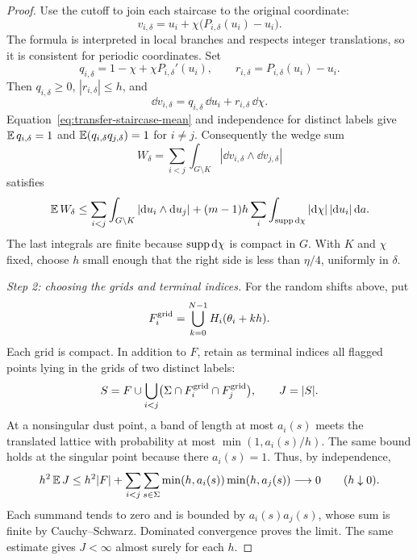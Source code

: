 \begin{proof}
Use the cutoff to join each staircase to the original coordinate:
\begin{equation}\label{eq:transfer-staircase}
 v_{i,\delta}
 =u_i+\chi\bigl(P_{i,\delta}(u_i)-u_i\bigr).
\end{equation}
The formula is interpreted in local branches and respects integer
translations, so it is consistent for periodic coordinates.  Set
\[
 q_{i,\delta}=1-\chi+\chi P_{i,\delta}'(u_i),
 \qquad r_{i,\delta}=P_{i,\delta}(u_i)-u_i.
\]
Then $q_{i,\delta}\ge0$, $|r_{i,\delta}|\le h$, and
\[
 \dd v_{i,\delta}
 =q_{i,\delta}\,\dd u_i+r_{i,\delta}\,\dd\chi.
\]
Equation~\eqref{eq:transfer-staircase-mean} and independence for distinct
labels give $\operatorname{\mathbb E} q_{i,\delta}=1$ and
$\operatorname{\mathbb E}(q_{i,\delta}q_{j,\delta})=1$ for $i\ne j$.  Consequently the wedge
sum
\[
 W_\delta
 =\sum_{i<j}\int_{G\setminus K}
             |\dd v_{i,\delta}\wedge\dd v_{j,\delta}|
\]
satisfies
\begin{equation}\label{eq:transfer-wedge-mean}
 \operatorname{\mathbb E} W_\delta
 \le \sum_{i<j}\int_{G\setminus K}|\mathrm d u_i\wedge\mathrm d u_j|
   +(m-1)h\sum_i\int_{\operatorname{supp}\mathrm d\chi}
                         |\mathrm d\chi|\,|\mathrm d u_i|\,\mathrm d a.
\end{equation}
The last integrals are finite because $\operatorname{supp}\mathrm d\chi$ is compact in
$G$.  With $K$ and $\chi$ fixed, choose $h$ small enough that the
right side is less than $\eta/4$, uniformly in $\delta$.

\smallskip\noindent
\emph{Step 2: choosing the grids and terminal indices.}
For the random shifts above, put
\[
 F_i^{\rm grid}
   =\bigcup_{k=0}^{N-1}H_i(\theta_i+kh).
\]
Each grid is compact.  In addition to $F$, retain as terminal indices
all flagged points lying in the grids of two distinct labels:
\[
 S=F\cup
 \bigcup_{i<j}\bigl(\Sigma\cap F_i^{\rm grid}
                                  \cap F_j^{\rm grid}\bigr),
 \qquad J=|S|.
\]
At a nonsingular dust point, a band of length at most $a_i(s)$ meets
the translated lattice with probability at most
$\min(1,a_i(s)/h)$.  The same bound holds at the singular point because
there $a_i(s)=1$.  Thus, by independence,
\begin{equation}\label{eq:transfer-terminal-mean}
 h^2\operatorname{\mathbb E} J
 \le h^2|F|+
       \sum_{i<j}\sum_{s\in\Sigma}
                 \min(h,a_i(s))\min(h,a_j(s))
 \longrightarrow0\qquad(h\downarrow0).
\end{equation}
Each summand tends to zero and is bounded by $a_i(s)a_j(s)$, whose
sum is finite by Cauchy--Schwarz.  Dominated convergence proves the
limit.  The same estimate gives $J<\infty$ almost surely for each $h$.


\end{proof}
